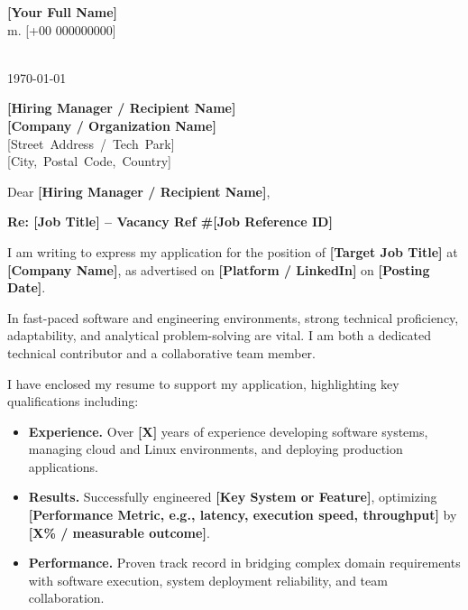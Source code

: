 \documentclass[11pt,a4paper]{article}
\makeatletter
\newcommand{\ApplicantName}{[Your Full Name]}
\newcommand{\ApplicantPhone}{[+00 000000000]}
\newcommand{\ApplicantEmail}{[your.email@example.com]}
\newcommand{\ApplicantLocation}{[City, Country]}
\makeatother
\begin{document}
\pagestyle{empty}

\begin{flushleft}
\textbf{\ApplicantName} \\
m. \ApplicantPhone \\
\ApplicantEmail \\
\ApplicantLocation
\end{flushleft}

\vspace{1.5em}

\today

\vspace{1.5em}

\begin{flushleft}
\textbf{[Hiring Manager / Recipient Name]} \\
\textbf{[Company / Organization Name]} \\
\mbox{[Street Address / Tech Park]} \\
\mbox{[City, Postal Code, Country]}
\end{flushleft}

\vspace{1.5em}

Dear \textbf{[Hiring Manager / Recipient Name]},

\textbf{Re: \textbf{[Job Title]} -- Vacancy Ref \#\textbf{[Job Reference ID]}}

I am writing to express my application for the position of \textbf{[Target Job Title]} at \textbf{[Company Name]}, as advertised on \textbf{[Platform / LinkedIn]} on \textbf{[Posting Date]}.

In fast-paced software and engineering environments, strong technical proficiency, adaptability, and analytical problem-solving are vital. I am both a dedicated technical contributor and a collaborative team member.

I have enclosed my resume to support my application, highlighting key qualifications including:

\begin{itemize}[leftmargin=2em, label=--]
    \item \textbf{Experience.} Over \textbf{[X]} years of experience developing software systems, managing cloud and Linux environments, and deploying production applications.
    \item \textbf{Results.} Successfully engineered \textbf{[Key System or Feature]}, optimizing \textbf{[Performance Metric, e.g., latency, execution speed, throughput]} by \textbf{[X\% / measurable outcome]}.
    \item \textbf{Performance.} Proven track record in bridging complex domain requirements with software execution, system deployment reliability, and team collaboration.
\end{itemize}
\end{document}
